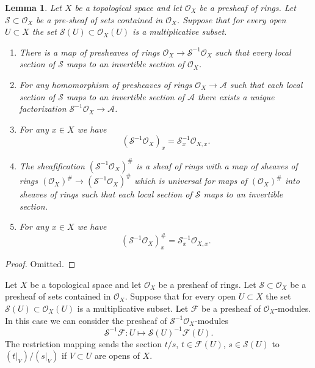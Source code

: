 \documentclass{stacks-project}
\theoremstyle{plain}
\newtheorem{lemma}[subsection]{Lemma}
\theoremstyle{definition}
\theoremstyle{remark}
\numberwithin{equation}{subsection}
\begin{document}
\begin{lemma}
\label{lemma-simple-invert}
Let $X$ be a topological space and let $\mathcal{O}_X$ be a
presheaf of rings. Let $\mathcal{S} \subset \mathcal{O}_X$
be a pre-sheaf of sets contained in $\mathcal{O}_X$.
Suppose that for every open $U \subset X$ the set
$\mathcal{S}(U) \subset \mathcal{O}_X(U)$ is a multiplicative subset.
\begin{enumerate}
\item There is a map of presheaves of rings
$\mathcal{O}_X \to \mathcal{S}^{-1}\mathcal{O}_X$
such that every local section of $\mathcal{S}$ maps to an invertible
section of $\mathcal{O}_X$.
\item For any homomorphism of presheaves of rings
$\mathcal{O}_X \to \mathcal{A}$ such that each local section
of $\mathcal{S}$ maps to an invertible section of $\mathcal{A}$
there exists a unique factorization
$\mathcal{S}^{-1}\mathcal{O}_X \to \mathcal{A}$.
\item For any $x \in X$ we have
$$
(\mathcal{S}^{-1}\mathcal{O}_X)_x = \mathcal{S}_x^{-1} \mathcal{O}_{X, x}.
$$
\item The sheafification $(\mathcal{S}^{-1}\mathcal{O}_X)^\#$ is a sheaf
of rings with a map of sheaves of rings
$(\mathcal{O}_X)^\# \to (\mathcal{S}^{-1}\mathcal{O}_X)^\#$
which is universal for maps of $(\mathcal{O}_X)^\#$ into sheaves
of rings such that each local section of $\mathcal{S}$ maps
to an invertible section.
\item For any $x \in X$ we have
$$
(\mathcal{S}^{-1}\mathcal{O}_X)^\#_x = \mathcal{S}_x^{-1} \mathcal{O}_{X, x}.
$$
\end{enumerate}
\end{lemma}

\begin{proof}
Omitted.
\end{proof}

\noindent
Let $X$ be a topological space and let $\mathcal{O}_X$ be a
presheaf of rings. Let $\mathcal{S} \subset \mathcal{O}_X$
be a presheaf of sets contained in $\mathcal{O}_X$.
Suppose that for every open $U \subset X$ the set
$\mathcal{S}(U) \subset \mathcal{O}_X(U)$ is a multiplicative subset.
Let $\mathcal{F}$ be a presheaf of $\mathcal{O}_X$-modules.
In this case we can consider the presheaf of
$\mathcal{S}^{-1}\mathcal{O}_X$-modules
$$
\mathcal{S}^{-1}\mathcal{F} :
U \longmapsto \mathcal{S}(U)^{-1}\mathcal{F}(U).
$$
The restriction mapping sends the section $t/s$, $t \in \mathcal{F}(U)$,
$s \in \mathcal{S}(U)$ to $(t|_V)/(s|_V)$ if $V \subset U$ are opens
of $X$.
\end{document}
